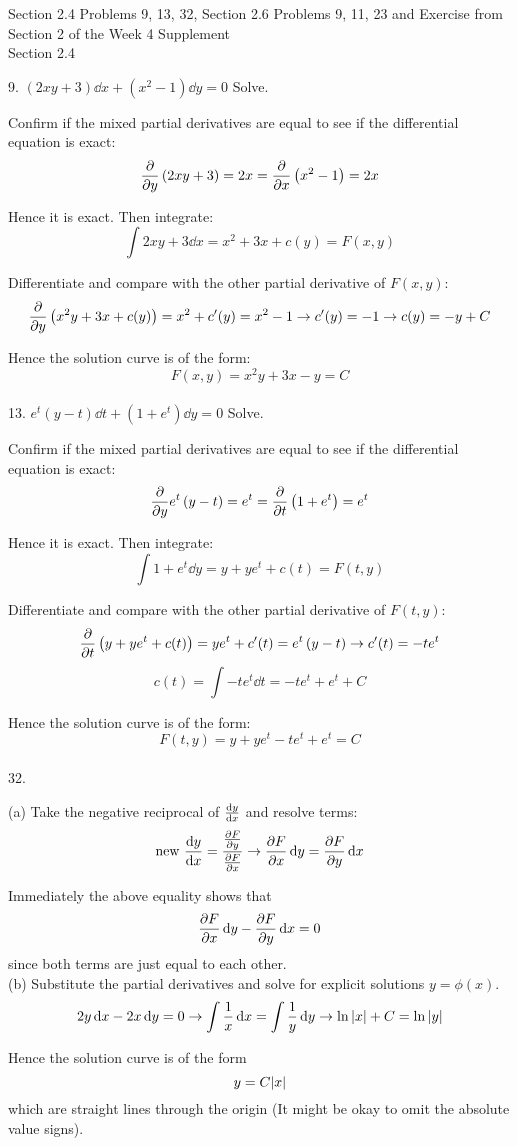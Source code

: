 \documentclass[11pt]{article}
\newcommand{\br}[1]{\left(#1\right)}
\begin{document}
Section 2.4 Problems 9, 13, 32, Section 2.6 Problems 9, 11, 23 and Exercise from Section 2 of the Week 4 Supplement\\

Section 2.4

9. $\br{2xy + 3}\dd{x} + \br{x^2-1}\dd{y} = 0$ Solve.

Confirm if the mixed partial derivatives are equal to see if the differential equation is exact:
$$\pdv{y}\br{2xy + 3} = 2x = \pdv{x}\br{x^2-1} = 2x$$

Hence it is exact. Then integrate:
$$\int 2xy+3 \dd{x} = x^2 + 3x + c(y) = F(x,y)$$

Differentiate and compare with the other partial derivative of $F(x,y)$:
$$\pdv{y}\br{x^2y + 3x + c(y)} = x^2 + c^{\prime}(y) = x^2-1 \to c^{\prime}(y) = -1 \to c(y) = -y + C$$

Hence the solution curve is of the form:
$$F(x,y) = x^2y + 3x -y = C$$ \\

13. $e^t\br{y-t}\dd{t} + \br{1+e^t}\dd{y} = 0$ Solve.

Confirm if the mixed partial derivatives are equal to see if the differential equation is exact:
$$\pdv{y}e^t\br{y-t} = e^t = \pdv{t}\br{1+e^t} = e^t$$

Hence it is exact. Then integrate:
$$\int 1+e^t \dd{y} = y + ye^t + c(t) = F(t,y)$$

Differentiate and compare with the other partial derivative of $F(t,y)$:
$$\pdv{t} \br{y + ye^t + c(t)} = ye^t + c^{\prime}(t) = e^t\br{y-t} \to c^{\prime}(t) = -te^t$$
$$c(t) = \int -te^t\dd{t} = -te^t + e^t + C$$

Hence the solution curve is of the form:
$$F(t,y) = y + ye^t - te^t + e^t = C$$ \\

32.

(a) Take the negative reciprocal of $\dv{y}{x}$ and resolve terms:
$$\text{new } \dv{y}{x} = \frac{\pdv{F}{y}}{\pdv{F}{x}} \to \pdv{F}{x}\dd{y} = \pdv{F}{y}\dd{x}$$

Immediately the above equality shows that $$\pdv{F}{x}\dd{y} - \pdv{F}{y}\dd{x} = 0$$
since both terms are just equal to each other.\\

(b) Substitute the partial derivatives and solve for explicit solutions $y = \phi(x)$.
$$2y\dd{x} - 2x\dd{y} = 0 \to \int \frac{1}{x}\dd{x} = \int \frac{1}{y}\dd{y} \to \ln\abs{x} + C = \ln\abs{y}$$

Hence the solution curve is of the form
$$y = C\abs{x}$$
which are straight lines through the origin (It might be okay to omit the absolute value signs). \\
\end{document}
